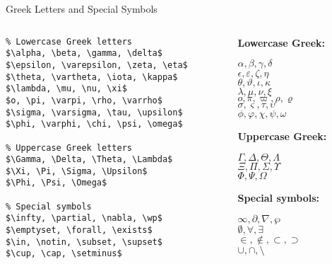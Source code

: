 \begin{frame}[fragile]{Greek Letters and Special Symbols}
    \begin{columns}
        \begin{column}{0.5\textwidth}
            \begin{lstlisting}
% Lowercase Greek letters
$\alpha, \beta, \gamma, \delta$
$\epsilon, \varepsilon, \zeta, \eta$
$\theta, \vartheta, \iota, \kappa$
$\lambda, \mu, \nu, \xi$
$o, \pi, \varpi, \rho, \varrho$
$\sigma, \varsigma, \tau, \upsilon$
$\phi, \varphi, \chi, \psi, \omega$

% Uppercase Greek letters
$\Gamma, \Delta, \Theta, \Lambda$
$\Xi, \Pi, \Sigma, \Upsilon$
$\Phi, \Psi, \Omega$

% Special symbols
$\infty, \partial, \nabla, \wp$
$\emptyset, \forall, \exists$
$\in, \notin, \subset, \supset$
$\cup, \cap, \setminus$
            \end{lstlisting}
        \end{column}
        
        \begin{column}{0.5\textwidth}
            \textbf{Lowercase Greek:}
            \begin{center}
$\alpha, \beta, \gamma, \delta$\\
$\epsilon, \varepsilon, \zeta, \eta$\\
$\theta, \vartheta, \iota, \kappa$\\
$\lambda, \mu, \nu, \xi$\\
$o, \pi, \varpi, \rho, \varrho$\\
$\sigma, \varsigma, \tau, \upsilon$\\
$\phi, \varphi, \chi, \psi, \omega$
            \end{center}
            
            \textbf{Uppercase Greek:}
            \begin{center}
$\Gamma, \Delta, \Theta, \Lambda$\\
$\Xi, \Pi, \Sigma, \Upsilon$\\
$\Phi, \Psi, \Omega$
            \end{center}
            
            \textbf{Special symbols:}
            \begin{center}
$\infty, \partial, \nabla, \wp$\\
$\emptyset, \forall, \exists$\\
$\in, \notin, \subset, \supset$\\
$\cup, \cap, \setminus$
            \end{center}
        \end{column}
    \end{columns}
\end{frame}

